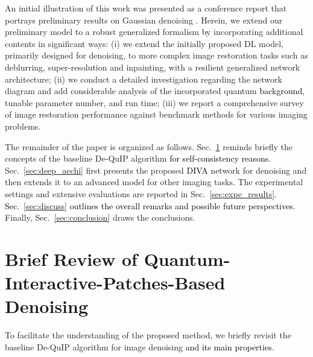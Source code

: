 \documentclass[10pt,journal,compsoc]{IEEEtran}
\newcommand{\sd}{\textcolor{black}}
\newcommand{\dk}{\textcolor{black}}
\begin{document}
An initial illustration of this work was presented as a conference report that portrays preliminary results on Gaussian denoising \cite{dutta2022deep}. Herein, we extend our preliminary model to a robust generalized formalism by incorporating additional contents in significant ways:
(i) we extend the initially proposed DL model, primarily designed for denoising, to more complex image restoration tasks such as deblurring, super-resolution and inpainting, with a resilient generalized network architecture;
(ii) we conduct a detailed investigation regarding the network diagram and add considerable analysis of the incorporated quantum \sd{background}, tunable parameter number, and run time;
(iii) we report a comprehensive survey of image restoration performance against benchmark methods for various imaging problems.




The remainder of the paper is organized as follows. Sec.~\ref{sec:related_work} reminds briefly the concepts of the baseline De-QuIP algorithm \dk{for self-consistency reasons}. Sec.~\ref{sec:deep_aechi} first presents the proposed \dk{DIVA} network for denoising and then extends it to an advanced model for other imaging tasks. The experimental settings and extensive evaluations are reported in Sec.~\ref{sec:expe_results}.
\sd{Sec.~\ref{sec:discuss} outlines the overall remarks and possible future perspectives.}
Finally, Sec.~\ref{sec:conclusion} draws the conclusions.






\section{Brief Review of Quantum-Interactive-Patches-Based Denoising}
\label{sec:related_work}

To facilitate the understanding of the proposed method, we briefly revisit the baseline De-QuIP algorithm for image denoising \sd{and its main properties}.


\end{document}
